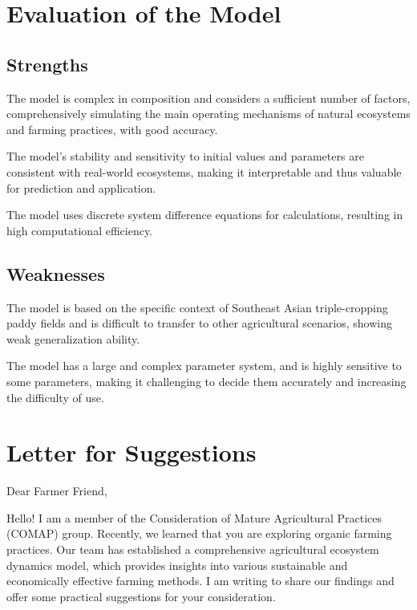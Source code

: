 \documentclass{HZNUMCM}
\begin{document}
  \section{Evaluation of the Model}
    \subsection{Strengths}
    The model is complex in composition and considers a sufficient number of factors, 
    comprehensively simulating the main operating mechanisms of natural ecosystems and farming practices, with good accuracy.
    
    The model's stability and sensitivity to initial values and parameters are consistent with real-world ecosystems, 
    making it interpretable and thus valuable for prediction and application.
    
    The model uses discrete system difference equations for calculations, 
    resulting in high computational efficiency.
    \subsection{Weaknesses}
    The model is based on the specific context of Southeast Asian triple-cropping paddy fields and is difficult to transfer to other agricultural scenarios, 
    showing weak generalization ability.
    
    The model has a large and complex parameter system, 
    and is highly sensitive to some parameters, 
    making it challenging to decide them accurately and increasing the difficulty of use.
  

\appendix
\newpage
\section{Letter for Suggestions}
\noindent Dear Farmer Friend,  

Hello! I am a member of the Consideration of Mature Agricultural Practices (COMAP) group. 
Recently, we learned that you are exploring organic farming practices. 
Our team has established a comprehensive agricultural ecosystem dynamics model, 
which provides insights into various sustainable and economically effective farming methods. 
I am writing to share our findings and offer some practical suggestions for your consideration.
\end{document}
